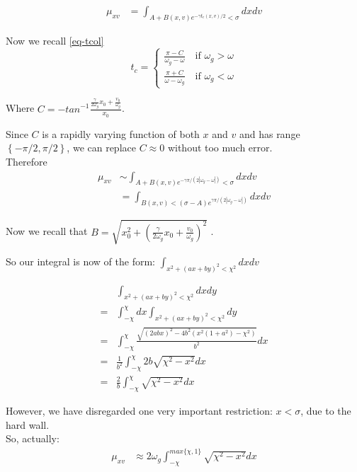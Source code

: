 \documentclass[oneside]{book}
\renewcommand{\(}{\begin{columns}}
\renewcommand{\)}{\end{columns}}
\newcommand{\<}[1]{\begin{column}{#1}}
\renewcommand{\>}{\end{column}}
\begin{document}
\begin{align*}
\mu_{xv}&=\int_{A+B(x,v)e^{-\gamma t_c(x,v)/2}<\sigma}dxdv
\end{align*}


Now we recall \eqref{eq-tcol}
\begin{equation}
t_c= \left\{
\begin{matrix}
\frac{\pi-C}{\omega_g-\omega}\hspace{1em} \text{if }\omega_g>\omega\\
\frac{\pi+C}{\omega-\omega_g}\hspace{1em} \text{if }\omega_g<\omega
\end{matrix}
\right.  
\end{equation}


Where $C=-tan^{-1}\frac{\frac{\gamma}{2\omega_g}x_0+\frac{v_0}{\omega_g}}{x_0}$.  

Since $C$ is a rapidly varying function of both $x$ and $v$ and has range 
$\left\{-\pi/2,\pi/2\right\}$, we can replace $C\approx 0$ without too much error.  \\

Therefore 
\begin{align*}
\mu_{xv}&\sim\int_{A+B(x,v)e^{-\gamma \pi/(2|\omega_g-\omega|)}<\sigma}dxdv\\
&=\int_{B(x,v)<(\sigma-A)e^{\gamma \pi/(2|\omega_g-\omega|)}}dxdv
\end{align*}

Now we recall that 
$B=\sqrt{x_0^2+\left(\frac{\gamma}{2\omega_g}x_0+\frac{v_0}{\omega_g}\right)^2}$
.  

So our integral is now of the form:
$\int_{x^2+(ax+by)^2<\chi^2}dxdv$


\begin{align*}
&\int_{x^2+(ax+by)^2<\chi^2}dxdy\\
=&\int_{-\chi}^{\chi}dx\int_{x^2+(ax+by)^2<\chi^2} dy\\
=&\int_{-\chi}^{\chi} \frac{\sqrt{(2abx)^2-4b^2(x^2(1+a^2)-\chi^2)}}{b^2}   dx\\
=&\frac{1}{b^2}\int_{-\chi}^{\chi}2b\sqrt{\chi^2-x^2} dx\\
=&\frac{2}{b}\int_{-\chi}^{\chi}\sqrt{\chi^2-x^2} dx
\end{align*}

However, we have disregarded one very important restriction: $x<\sigma$, due to 
the hard wall.  \\

So, actually:
\begin{align}
\label{mu-analytical}
\mu_{xv}&\approx2\omega_g\int_{-\chi}^{max\{\chi,1\}} \sqrt{\chi^2-x^2}dx
\end{align}
\end{document}
